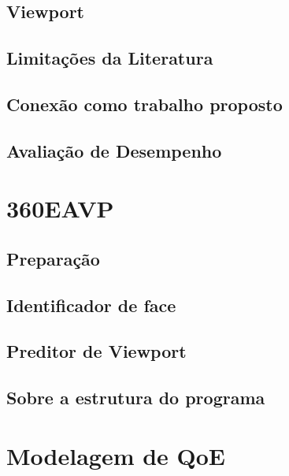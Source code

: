 \subsection{Viewport}
\subsection{Limitações da Literatura}
\subsection{Conexão como trabalho proposto}
\subsection{Avaliação de Desempenho}


\section{360EAVP}
\subsection{Preparação}
\subsection{Identificador de face}
\subsection{Preditor de Viewport}
\subsection{Sobre a estrutura do programa}

\section{Modelagem de QoE}

